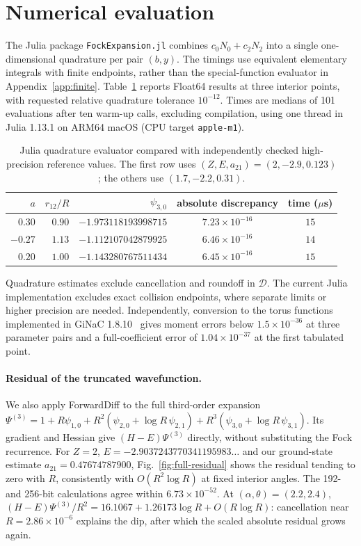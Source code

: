 \documentclass[10pt]{article}
\begin{document}
\section{Numerical evaluation}
The Julia package \texttt{FockExpansion.jl} combines $c_0N_0+c_2N_2$ into a single one-dimensional quadrature per pair $(b,y)$.
The timings use equivalent elementary integrals with finite endpoints, rather than the special-function evaluator in Appendix~\ref{app:finite}.
Table~\ref{tab:timing} reports Float64 results at three interior points, with requested relative quadrature tolerance $10^{-12}$.
Times are medians of 101 evaluations after ten warm-up calls, excluding compilation, using one thread in Julia 1.13.1 on ARM64 macOS (CPU target \texttt{apple-m1}).
\begin{table}[h]
\centering
\begin{tabular}{rrrcc}\toprule
$a$ & $r_{12}/R$ & $\psi_{3,0}$ & absolute discrepancy & time ($\mu$s)\\\midrule
$0.30$ & $0.90$ & $-1.973118193998715$ & $7.23\times10^{-16}$ & $15$\\
$-0.27$ & $1.13$ & $-1.112107042879925$ & $6.46\times10^{-16}$ & $14$\\
$0.20$ & $1.00$ & $-1.143280767511434$ & $6.45\times10^{-16}$ & $15$\\\bottomrule
\end{tabular}
\caption{Julia quadrature evaluator compared with independently checked high-precision reference values.
The first row uses $(Z,E,a_{21})=(2,-2.9,0.123)$; the others use $(1.7,-2.2,0.31)$.}
\label{tab:timing}
\end{table}
Quadrature estimates exclude cancellation and roundoff in $\mathcal D$.
The current Julia implementation excludes exact collision endpoints, where separate limits or higher precision are needed.
Independently, conversion to the torus functions implemented in GiNaC 1.8.10~\cite{GiNaCEMP} gives moment errors below $1.5\times10^{-36}$ at three parameter pairs and a full-coefficient error of $1.04\times10^{-37}$ at the first tabulated point.

\paragraph{Residual of the truncated wavefunction.}
We also apply ForwardDiff to the full third-order expansion
$\Psi^{(3)}=1+R\psi_{1,0}+R^2(\psi_{2,0}+\log R\,\psi_{2,1})+R^3(\psi_{3,0}+\log R\,\psi_{3,1})$.
Its gradient and Hessian give $(H-E)\Psi^{(3)}$ directly, without substituting the Fock recurrence.
For $Z=2$, $E=-2.9037243770341195983\ldots$ and our ground-state estimate $a_{21}=0.47674787900$, Fig.~\ref{fig:full-residual} shows the residual tending to zero with $R$, consistently with $O(R^2\log R)$ at fixed interior angles.
The 192- and 256-bit calculations agree within $6.73\times10^{-52}$.
At $(\alpha,\theta)=(2.2,2.4)$, $(H-E)\Psi^{(3)}/R^2=16.1067+1.26173\log R+O(R\log R)$: cancellation near $R=2.86\times10^{-6}$ explains the dip, after which the scaled absolute residual grows again.
\end{document}

